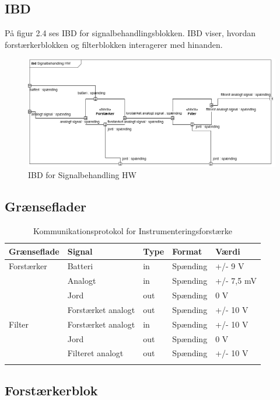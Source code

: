 \subsection{IBD}
På figur 2.4 ses IBD for signalbehandlingsblokken. IBD viser, hvordan forstærkerblokken og filterblokken interagerer med hinanden. 

\begin{figure}[H]
	\centering
	\includegraphics[width=1\textwidth]{Figurer/5}
	\caption{IBD for Signalbehandling HW}
	\label{fig:IBDhw-diagram}
\end{figure}

\subsection{Grænseflader}

\begin{longtabu} to 
	\textbf{Grænseflade} & \textbf{Signal} & \textbf{Type} & \textbf{Format} & \textbf{Værdi} \\[-1ex]
	\midrule
	Forstærker & Batteri & in & Spænding & +/- 9 V \\[-1ex]
			   & Analogt & in & Spænding & +/- 7,5 mV \\[-1ex]
			   & Jord	 & out & Spænding & 0 V \\[-1ex]
			   & Forstærket analogt & out & Spænding & +/- 10 V \\[-1ex]
	Filter	   & Forstærket analogt & in & Spænding & +/- 10 V\\[-1ex]
			   & Jord	 & out & Spænding & 0 V\\[-1ex]
			   & Filteret analogt & out & Spænding & +/- 10 V\\[-1ex]
	\caption{Kommunikationsprotokol for Instrumenteringsforstærke}	
\end{longtabu}


 \subsection{Forstærkerblok}
